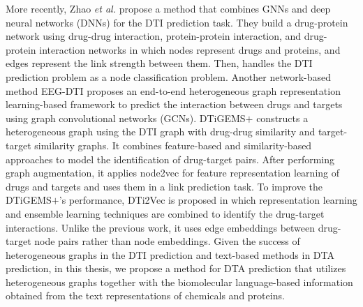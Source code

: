 More recently, Zhao \textit{et al.} \cite{zhao2021identifying} propose a method that combines GNNs and deep neural networks (DNNs) for the DTI prediction task. They build a drug-protein network using drug-drug interaction, protein-protein interaction, and drug-protein interaction networks in which nodes represent drugs and proteins, and edges represent the link strength between them. Then, handles the DTI prediction problem as a node classification problem. Another network-based method EEG-DTI \cite{peng2021end} proposes an end-to-end heterogeneous graph representation learning-based framework to predict the interaction between drugs and targets using graph convolutional networks (GCNs). DTiGEMS$+$ \cite{thafar2020dtigems+} constructs a heterogeneous graph using the DTI graph with drug-drug similarity and target-target similarity graphs. It combines feature-based and similarity-based approaches to model the identification of drug-target pairs. After performing graph augmentation, it applies node2vec \cite{grover2016node2vec} for feature representation learning of drugs and targets and uses them in a link prediction task. To improve the DTiGEMS$+$'s performance, DTi2Vec \cite{thafar2021dti2vec} is proposed in which representation learning and ensemble learning techniques are combined to identify the drug-target interactions. Unlike the previous work, it uses edge embeddings between drug-target node pairs rather than node embeddings. Given the success of heterogeneous graphs in the DTI prediction and text-based methods in DTA prediction, in this thesis, we propose a method for DTA prediction that utilizes heterogeneous graphs together with the biomolecular language-based information obtained from the text representations of chemicals and proteins. 


